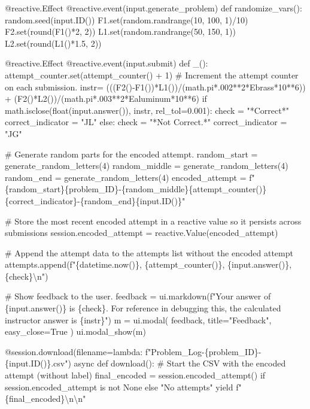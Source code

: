 \documentclass[
  letterpaper,
  DIV=11,
  numbers=noendperiod]{scrreprt}
\newenvironment{Shaded}{\begin{snugshade}}{\end{snugshade}}
\newcommand{\NormalTok}[1]{\textcolor[rgb]{0.00,0.23,0.31}{#1}}
\begin{document}
\begin{Shaded}
\begin{Highlighting}[]
\NormalTok{    @reactive.Effect}
\NormalTok{    @reactive.event(input.generate\_problem)}
\NormalTok{    def randomize\_vars():}
\NormalTok{        random.seed(input.ID())}
\NormalTok{        F1.set(random.randrange(10, 100, 1)/10)}
\NormalTok{        F2.set(round(F1()*2, 2))}
\NormalTok{        L1.set(random.randrange(50, 150, 1))}
\NormalTok{        L2.set(round(L1()*1.5, 2))}
        

\NormalTok{    @reactive.Effect}
\NormalTok{    @reactive.event(input.submit)}
\NormalTok{    def \_():}
\NormalTok{        attempt\_counter.set(attempt\_counter() + 1)  \# Increment the attempt counter on each submission.}
\NormalTok{        instr= (((F2(){-}F1())*L1())/(math.pi*.002**2*Ebrass*10**6)) + (F2()*L2())/(math.pi*.003**2*Ealuminum*10**6)}
\NormalTok{        if math.isclose(float(input.answer()), instr, rel\_tol=0.001):}
\NormalTok{            check = "*Correct*"}
\NormalTok{            correct\_indicator = "JL"}
\NormalTok{        else:}
\NormalTok{            check = "*Not Correct.*"}
\NormalTok{            correct\_indicator = "JG"}

\NormalTok{        \# Generate random parts for the encoded attempt.}
\NormalTok{        random\_start = generate\_random\_letters(4)}
\NormalTok{        random\_middle = generate\_random\_letters(4)}
\NormalTok{        random\_end = generate\_random\_letters(4)}
\NormalTok{        encoded\_attempt = f"\{random\_start\}\{problem\_ID\}{-}\{random\_middle\}\{attempt\_counter()\}\{correct\_indicator\}{-}\{random\_end\}\{input.ID()\}"}

\NormalTok{        \# Store the most recent encoded attempt in a reactive value so it persists across submissions}
\NormalTok{        session.encoded\_attempt = reactive.Value(encoded\_attempt)}

\NormalTok{        \# Append the attempt data to the attempts list without the encoded attempt}
\NormalTok{        attempts.append(f"\{datetime.now()\}, \{attempt\_counter()\}, \{input.answer()\}, \{check\}\textbackslash{}n")}

\NormalTok{        \# Show feedback to the user.}
\NormalTok{        feedback = ui.markdown(f"Your answer of \{input.answer()\} is \{check\}. For reference in debugging this, the calculated instructor answer is \{instr\}")}
\NormalTok{        m = ui.modal(}
\NormalTok{            feedback,}
\NormalTok{            title="Feedback",}
\NormalTok{            easy\_close=True}
\NormalTok{        )}
\NormalTok{        ui.modal\_show(m)}

\NormalTok{    @session.download(filename=lambda: f"Problem\_Log{-}\{problem\_ID\}{-}\{input.ID()\}.csv")}
\NormalTok{    async def download():}
\NormalTok{        \# Start the CSV with the encoded attempt (without label)}
\NormalTok{        final\_encoded = session.encoded\_attempt() if session.encoded\_attempt is not None else "No attempts"}
\NormalTok{        yield f"\{final\_encoded\}\textbackslash{}n\textbackslash{}n"}
        

\end{Highlighting}
\end{Shaded}
\end{document}
